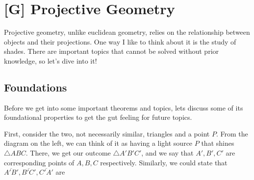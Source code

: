 \documentclass[../../../main.tex]{subfiles}
\begin{document}
\chapter{[G] Projective Geometry}

Projective geometry, unlike euclidean geometry, relies on the
relationship between objects and their projections. One way I like to
think about it is the study of shades. There are  important topics
that cannot be solved without prior knowledge, so let's dive into it!

\section{Foundations}

Before we get into some important theorems and topics, lets discuss
some of its foundational properties to get the gut feeling for future
topics.

\begin{minipage}{0.48\textwidth}
\begin{figure}[H]
\centering
{}
\caption{}
\label{fig:Desargues Theorem Figure 1}
\end{figure}
\end{minipage}
\hfill
\begin{minipage}{0.48\textwidth}
First, consider the two, not necessarily similar, triangles and a
point $P$. From the diagram on the left, we can think of it as having
a light source $P$ that shines $\triangle{ABC}$. There, we get our
outcome $\triangle{A'B'C'}$, and we say that $A', B', C'$ are
corresponding points of $A, B, C$ respectively. Similarly,
we could state that $\overline{A'B'}, \overline{B'C'},
\overline{C'A'}$ are
\end{minipage}
\end{document}
